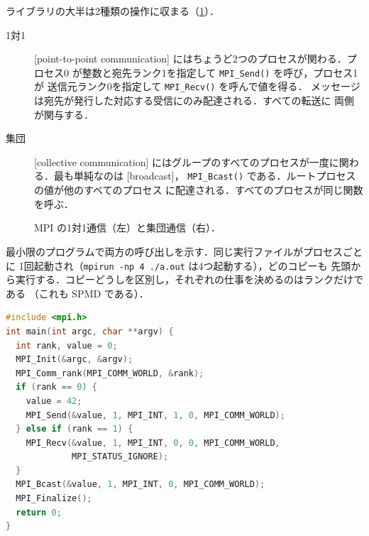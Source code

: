 \documentclass[../main.tex]{subfiles}
\begin{document}
ライブラリの大半は2種類の操作に収まる（\cref{fig:l02-mpi-messages}）．
\begin{description}
  \item[1対1]  [point-to-point communication]
    にはちょうど2つのプロセスが関わる．プロセス0
    が整数と宛先ランク1を指定して \texttt{MPI\_Send()} を呼び，プロセス1が
    送信元ランク0を指定して \texttt{MPI\_Recv()} を呼んで値を得る．
    メッセージは宛先が発行した対応する受信にのみ配達される．すべての転送に
    両側が関与する．
  \item[集団]  [collective communication]
    にはグループのすべてのプロセスが一度に関わる．最も単純なのは
    [broadcast]，
    \texttt{MPI\_Bcast()} である．ルートプロセスの値が他のすべてのプロセス
    に配達される．すべてのプロセスが同じ関数を呼ぶ．
\end{description}

\begin{figure}[tb]
  \centering
  
  \caption{MPI の1対1通信（左）と集団通信（右）．}
  \label{fig:l02-mpi-messages}
\end{figure}

最小限のプログラムで両方の呼び出しを示す．同じ実行ファイルがプロセスごとに
1回起動され（\texttt{mpirun -np 4 ./a.out} は4つ起動する），どのコピーも
先頭から実行する．コピーどうしを区別し，それぞれの仕事を決めるのはランクだけである
（これも SPMD である）．
\begin{lstlisting}[language=C, numbers=none]
#include <mpi.h>
int main(int argc, char **argv) {
  int rank, value = 0;
  MPI_Init(&argc, &argv);
  MPI_Comm_rank(MPI_COMM_WORLD, &rank);
  if (rank == 0) {
    value = 42;
    MPI_Send(&value, 1, MPI_INT, 1, 0, MPI_COMM_WORLD);
  } else if (rank == 1) {
    MPI_Recv(&value, 1, MPI_INT, 0, 0, MPI_COMM_WORLD,
             MPI_STATUS_IGNORE);
  }
  MPI_Bcast(&value, 1, MPI_INT, 0, MPI_COMM_WORLD);
  MPI_Finalize();
  return 0;
}
\end{lstlisting}
\end{document}
